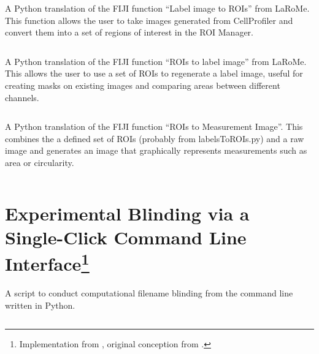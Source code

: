 \begin{code}
\caption{A Python translation of the FIJI function ``Label image to ROIs'' from LaRoMe. This function allows the user to take images generated from CellProfiler and convert them into a set of regions of interest in the ROI Manager.}
\label{l2r}

\inputminted[breaklines,frame=single,fontsize=\small]{python}{source/labelsToROIs.py}

\end{code}



\begin{code}
\caption{A Python translation of the FIJI function ``ROIs to label image'' from LaRoMe. This allows the user to use a set of ROIs to regenerate a label image, useful for creating masks on existing images and comparing areas between different channels.}
\label{r2l}

\inputminted[breaklines,frame=single,fontsize=\small]{python}{source/ROIsTolabels.py}

\end{code}



\begin{code}
\caption{A Python translation of the FIJI function ``ROIs to Measurement Image''. This combines the a defined set of ROIs (probably from labelsToROIs.py) and a raw image and generates an image that graphically represents measurements such as area or circularity.}
\label{r2m}

\inputminted[breaklines,frame=single,fontsize=\small]{python}{source/ROIsToMap.py}

\end{code}



\section[Experimental Blinding via a Single-Click Command Line Interface]{Experimental Blinding via a Single-Click Command Line Interface\footnote{Implementation from \citet{Brewer2022}, original conception from \citet{Salter2016}.}}\label{blinders}

\begin{code}
\caption{A script to conduct computational filename blinding from the command line written in Python.}
\label{blinder}

\inputminted[breaklines,frame=single,fontsize=\small]{python}{source/renamer.py}

\end{code}

